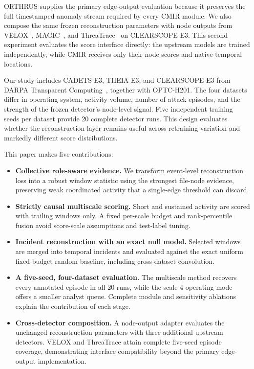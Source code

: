 \documentclass[lettersize,journal]{IEEEtran}
\newcommand{\method}{CMIR}
\begin{document}
ORTHRUS supplies the primary edge-output evaluation because it preserves the
full timestamped anomaly stream required by every \method{} module.  We also
compose the same frozen reconstruction parameters with node outputs from
VELOX~\cite{jiang2025orthrus}, MAGIC~\cite{jia2024magic}, and
ThreaTrace~\cite{wang2022threatrace} on CLEARSCOPE-E3.  This second experiment evaluates the
score interface directly: the upstream models are trained independently, while
\method{} receives only their node scores and native temporal locations.

Our study includes CADETS-E3, THEIA-E3, and CLEARSCOPE-E3 from DARPA Transparent
Computing~\cite{darpaTC}, together with OPTC-H201.  The four datasets differ in
operating system, activity volume, number of attack episodes, and the strength of
the frozen detector's node-level signal.  Five independent training seeds per
dataset provide 20 complete detector runs.  This design evaluates whether the
reconstruction layer remains useful across retraining variation and markedly
different score distributions.

This paper makes five contributions:
\begin{itemize}
  \item \textbf{Collective role-aware evidence.}  We transform event-level
  reconstruction loss into a robust window statistic using the strongest
  file-node evidence, preserving weak coordinated activity that a single-edge
  threshold can discard.
  \item \textbf{Strictly causal multiscale scoring.}  Short and sustained
  activity are scored with trailing windows only.  A fixed per-scale budget and
  rank-percentile fusion avoid score-scale assumptions and test-label tuning.
  \item \textbf{Incident reconstruction with an exact null model.}  Selected
  windows are merged into temporal incidents and evaluated against the exact
  uniform fixed-budget random baseline, including cross-dataset convolution.
  \item \textbf{A five-seed, four-dataset evaluation.}  The multiscale method
  recovers every annotated episode in all 20 runs, while the scale-4 operating
  mode offers a smaller analyst queue.  Complete module and sensitivity
  ablations explain the contribution of each stage.
  \item \textbf{Cross-detector composition.}  A node-output adapter evaluates
  the unchanged reconstruction parameters with three additional upstream
  detectors.  VELOX and ThreaTrace attain complete five-seed episode coverage,
  demonstrating interface compatibility beyond the primary edge-output
  implementation.
\end{itemize}
\end{document}
